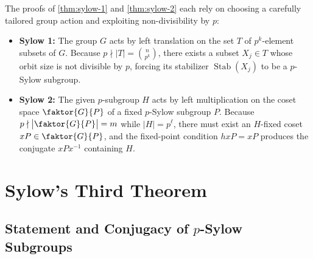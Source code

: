 \begin{insight}
The proofs of \cref{thm:sylow-1} and \cref{thm:sylow-2} each rely on choosing a carefully tailored group action and exploiting non-divisibility by $p$:
\begin{itemize}
    \item \textbf{Sylow 1:} The group $G$ acts by left translation on the set $T$ of $p^k$-element subsets of $G$. Because $p \nmid |T| = \binom{n}{p^k}$, there exists a subset $X_j \in T$ whose orbit size is not divisible by $p$, forcing its stabilizer $\operatorname{Stab}(X_j)$ to be a $p$-Sylow subgroup.
    \item \textbf{Sylow 2:} The given $p$-subgroup $H$ acts by left multiplication on the coset space $\faktor{G}{P}$ of a fixed $p$-Sylow subgroup $P$. Because $p \nmid \bigl|\faktor{G}{P}\bigr| = m$ while $|H| = p^\ell$, there must exist an $H$-fixed coset $x P \in \faktor{G}{P}$, and the fixed-point condition $h x P = x P$ produces the conjugate $x P x^{-1}$ containing $H$.
\end{itemize}
\end{insight}

\section{Sylow's Third Theorem}

\subsection{Statement and Conjugacy of \texorpdfstring{$p$}{p}-Sylow Subgroups}

